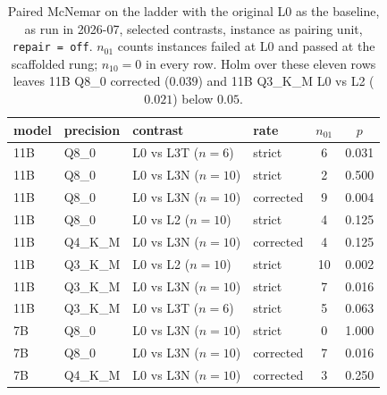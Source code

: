 \documentclass[11pt]{article}
\begin{document}
\begin{table}[h]
\centering\small
\caption{Paired McNemar on the ladder with the original L0 as the baseline, as run in 2026-07, selected contrasts, instance as pairing unit, \texttt{repair\,=\,off}. $n_{01}$ counts instances failed at L0 and passed at the scaffolded rung; $n_{10}=0$ in every row. Holm over these eleven rows leaves 11B Q8\_0 corrected ($0.039$) and 11B Q3\_K\_M L0 vs L2 ($0.021$) below $0.05$.}
\label{tab:laddermcnemar-l0}
\begin{tabular}{llllcc}
\toprule
model & precision & contrast & rate & $n_{01}$ & $p$ \\
\midrule
11B & Q8\_0 & L0 vs L3T ($n=6$)  & strict    & 6 & 0.031 \\
11B & Q8\_0 & L0 vs L3N ($n=10$) & strict    & 2 & 0.500 \\
11B & Q8\_0 & L0 vs L3N ($n=10$) & corrected & 9 & 0.004 \\
11B & Q8\_0 & L0 vs L2 ($n=10$)  & strict    & 4 & 0.125 \\
11B & Q4\_K\_M & L0 vs L3N ($n=10$) & corrected & 4 & 0.125 \\
11B & Q3\_K\_M & L0 vs L2 ($n=10$)  & strict & 10 & 0.002 \\
11B & Q3\_K\_M & L0 vs L3N ($n=10$) & strict & 7 & 0.016 \\
11B & Q3\_K\_M & L0 vs L3T ($n=6$)  & strict & 5 & 0.063 \\
7B  & Q8\_0 & L0 vs L3N ($n=10$) & strict    & 0 & 1.000 \\
7B  & Q8\_0 & L0 vs L3N ($n=10$) & corrected & 7 & 0.016 \\
7B  & Q4\_K\_M & L0 vs L3N ($n=10$) & corrected & 3 & 0.250 \\
\bottomrule
\end{tabular}
\end{table}
\end{document}
